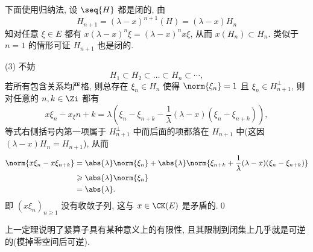 \begin{Proof}
        下面使用归纳法, 设 $ \seq{H} $ 都是闭的, 由
        \[
            H_{n+1}=(\lambda-x)^{n+1}(H)=(\lambda-x)H_n
        \]
        知对任意 $ \xi\in E $ 都有 $ x(\lambda-x)^n\xi=(\lambda-x)^nx\xi $, 从而 $ x(H_n)\subset H_n $. 类似于 $ n=1 $ 的情形可证 $ H_{n+1} $ 也是闭的.

        (3) 不妨
        \[
            H_1\subset H_2\subset\dots\subset H_n\subset\cdots,
        \]
        若所有包含关系均严格, 则总存在 $ \xi_n\in H_n $ 使得 $ \norm{\xi_n}=1 $ 且 $ \xi_n\in H_{n+1}^\bot $, 则对任意的 $ n,k\in\Zi $ 都有
        \[
            x\xi_n-x_\xi{n+k}=\lambda\left(\xi_n-\xi_{n+k}-\frac{1}{\lambda}(\lambda-x)(\xi_n-\xi_{n+k})\right),
        \]
        等式右侧括号内第一项属于 $ H_{n+1}^\bot $ 中而后面的项都落在 $ H_{n+1} $ 中(这因 $ (\lambda-x)H_n=H_{n+1} $), 从而
        \[
            \begin{aligned}
                \norm{x\xi_n-x\xi_{n+k}}&=\abs{\lambda}\norm{\xi_n}+\abs{\lambda}\norm{\xi_{n+k}+\frac{1}{\lambda}(\lambda-x)(\xi_n-\xi_{n+k})}\\
                &\geqslant\abs{\lambda}\norm{\xi_n}\\
                &=\abs{\lambda}.
            \end{aligned}
        \]
        即 $ (x\xi_n)_{n\geqslant 1} $ 没有收敛子列, 这与 $ x\in\CK(E) $ 是矛盾的.\qed
    \end{Proof}
	
	\begin{Remark}
		上一定理说明了紧算子具有某种意义上的有限性, 且其限制到闭集上几乎就是可逆的(模掉零空间后可逆).
	\end{Remark}

